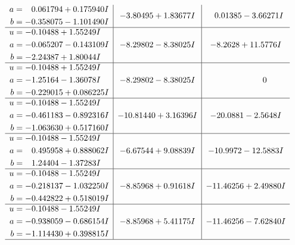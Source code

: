 \documentclass[1p]{elsarticle_modified}
\theoremstyle{definition}
\begin{document}
$$\begin{array}{c|c|c}
\begin{aligned}
a &= \phantom{-}0.061794 + 0.175940 I \\
b &= -0.358075 - 1.101490 I\end{aligned}
 & -3.80495 + 1.83677 I & \phantom{-}0.01385 - 3.66271 I \\ \hline\begin{aligned}
u &= -0.10488 + 1.55249 I \\
a &= -0.065207 - 0.143109 I \\
b &= -2.24387 + 1.80044 I\end{aligned}
 & -8.29802 - 8.38025 I & -8.2628 + 11.5776 I \\ \hline\begin{aligned}
u &= -0.10488 + 1.55249 I \\
a &= -1.25164 - 1.36078 I \\
b &= -0.229015 + 0.086225 I\end{aligned}
 & -8.29802 - 8.38025 I & \phantom{-0.000000 } 0 \\ \hline\begin{aligned}
u &= -0.10488 - 1.55249 I \\
a &= -0.461183 - 0.892316 I \\
b &= -1.063630 + 0.517160 I\end{aligned}
 & -10.81440 + 3.16396 I & -20.0881 - 2.5648 I \\ \hline\begin{aligned}
u &= -0.10488 - 1.55249 I \\
a &= \phantom{-}0.495958 + 0.888062 I \\
b &= \phantom{-}1.24404 - 1.37283 I\end{aligned}
 & -6.67544 + 9.08839 I & -10.9972 - 12.5883 I \\ \hline\begin{aligned}
u &= -0.10488 - 1.55249 I \\
a &= -0.218137 - 1.032250 I \\
b &= -0.442822 + 0.518019 I\end{aligned}
 & -8.85968 + 0.91618 I & -11.46256 + 2.49880 I \\ \hline\begin{aligned}
u &= -0.10488 - 1.55249 I \\
a &= -0.938059 - 0.686154 I \\
b &= -1.114430 + 0.398815 I\end{aligned}
 & -8.85968 + 5.41175 I & -11.46256 - 7.62840 I\\
 \hline 
 \end{array}$$\newpage$$\begin{array}{c|c|c}  

\end{array}$$
\end{document}
